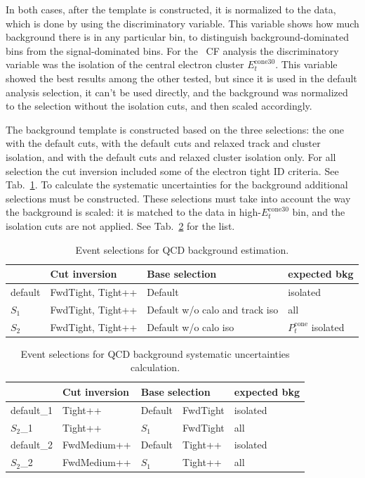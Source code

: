 In both cases, after the template is constructed, it is normalized to the data, which is done by using the discriminatory variable. This variable shows how much background there is in any particular bin, to distinguish background-dominated bins from the signal-dominated bins. For the \Zee\ CF analysis the discriminatory variable was the isolation of the central electron cluster $E_{t}^{\mathrm{cone30}}$. This variable showed the best results among the other tested, but since it is used in the default analysis selection, it can't be used directly, and the background was normalized to the selection without the isolation cuts, and then scaled accordingly.

The background template is constructed based on the three selections: the one with the default cuts, with the default cuts and relaxed track and cluster isolation, and with the default cuts and relaxed cluster isolation only. For all selection the cut inversion included some of the electron tight ID criteria. See Tab.~\ref{tab:bkg_qcd_samples}. To calculate the systematic uncertainties for the background additional selections must be constructed. These selections must take into account the way the background is scaled: it is matched to the data in high-$E_{t}^{\mathrm{cone30}}$ bin, and the isolation cuts are not applied. See Tab.~\ref{tab:bkg_qcd_unc_samples} for the list.

\begin{table}
\centering
\begin{tabular}{ llll } \hline \hline
    & Cut inversion  &   Base selection    & expected bkg  \\ \hline
default & FwdTight, Tight++ & Default  & isolated \\
$S_1$   & FwdTight, Tight++ & Default w/o calo and track iso & all \\
$S_2$   & FwdTight, Tight++ & Default w/o calo iso       & $P_{t}^{\mathrm{cone}}$ isolated\\
\hline \hline
\end{tabular}
\caption{Event selections for QCD background estimation.}
\label{tab:bkg_qcd_samples}
\end{table}
\begin{table}
\centering
\begin{tabular}{ lll@{ w/o }ll } \hline \hline
    & Cut inversion  &  \multicolumn{2}{l}{Base selection}    & expected bkg \\ \hline
default\_1 & Tight++     & Default & FwdTight  & isolated \\
$S_2$\_1     & Tight++     & $S_1$ & FwdTight      & all \\
default\_2 & FwdMedium++ & Default & Tight++   & isolated \\
$S_2$\_2     & FwdMedium++ & $S_1$ & Tight++       & all \\
\hline \hline
\end{tabular}
\caption{Event selections for QCD background systematic uncertainties calculation.}
\label{tab:bkg_qcd_unc_samples}
\end{table}

